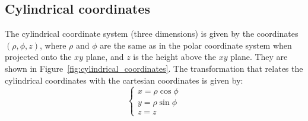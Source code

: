 \subsection{Cylindrical coordinates}

The cylindrical coordinate system (three dimensions) is given by the coordinates $(\rho, \phi, z)$, where $\rho$ and $\phi$ are the same as in the polar coordinate system when projected onto the $xy$ plane, and $z$ is the height above the $xy$ plane.
They are shown in Figure~\ref{fig:cylindrical_coordinates}.
The transformation that relates the cylindrical coordinates with the cartesian coordinates is given by:
\begin{equation*}
    \begin{cases}
        x = \rho \cos \phi \\
        y = \rho \sin \phi \\
        z = z
    \end{cases}
\end{equation*}
